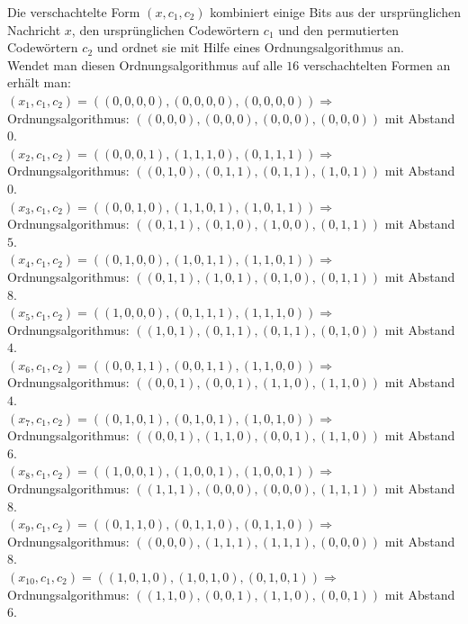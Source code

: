\begin{Beispiel}
    Die verschachtelte Form $(x,c_1,c_2)$ kombiniert einige Bits aus der ursprünglichen Nachricht $x$, den ursprünglichen Codewörtern $c_1$ und den permutierten Codewörtern $c_2$ und ordnet sie mit Hilfe eines Ordnungsalgorithmus an.\\
    Wendet man diesen Ordnungsalgorithmus auf alle $16$ verschachtelten Formen an erhält man:\\
    
    
    $(x_{1}, c_1, c_2) = ((0,0,0,0), (0,0,0,0), (0,0,0,0)) \Rightarrow$ Ordnungsalgorithmus: $((0,0,0),(0, 0,0),(0,0, 0),(0,0,0))$ mit Abstand $0$.\\
    
    $(x_{2}, c_1, c_2) = ((0,0,0,1), (1,1,1,0), (0,1,1,1)) \Rightarrow$ Ordnungsalgorithmus: $((0,1,0),(0, 1,1),(0,1, 1),(1,0,1))$ mit Abstand $0$.\\
    
    $(x_{3}, c_1, c_2) = ((0,0,1,0), (1,1,0,1), (1,0,1,1)) \Rightarrow$ Ordnungsalgorithmus: $((0,1,1),(0, 1,0),(1,0, 0),(0,1,1))$ mit Abstand $5$.\\
    
    $(x_{4}, c_1, c_2) = ((0,1,0,0), (1,0,1,1), (1,1,0,1)) \Rightarrow$ Ordnungsalgorithmus: $((0,1,1),(1, 0,1),(0,1, 0),(0,1,1))$ mit Abstand $8$.\\
    
    $(x_{5}, c_1, c_2) = ((1,0,0,0), (0,1,1,1), (1,1,1,0)) \Rightarrow$ Ordnungsalgorithmus: $((1,0,1),(0, 1,1),(0,1, 1),(0,1,0))$ mit Abstand $4$.\\
    
    $(x_{6}, c_1, c_2) = ((0,0,1,1), (0,0,1,1), (1,1,0,0)) \Rightarrow$ Ordnungsalgorithmus: $((0,0,1),(0, 0,1),(1,1, 0),(1,1,0))$ mit Abstand $4$.\\
    
    $(x_{7}, c_1, c_2) = ((0,1,0,1), (0,1,0,1), (1,0,1,0)) \Rightarrow$ Ordnungsalgorithmus: $((0,0,1),(1, 1,0),(0,0, 1),(1,1,0))$ mit Abstand $6$.\\
    
    $(x_{8}, c_1, c_2) = ((1,0,0,1), (1,0,0,1), (1,0,0,1)) \Rightarrow$ Ordnungsalgorithmus: $((1,1,1),(0, 0,0),(0,0, 0),(1,1,1))$ mit Abstand $8$.\\
    
    $(x_{9}, c_1, c_2) = ((0,1,1,0), (0,1,1,0), (0,1,1,0)) \Rightarrow$ Ordnungsalgorithmus: $((0,0,0),(1, 1,1),(1,1, 1),(0,0,0))$ mit Abstand $8$.\\
    
    $(x_{10}, c_1, c_2) = ((1,0,1,0), (1,0,1,0), (0,1,0,1)) \Rightarrow$ Ordnungsalgorithmus: $((1,1,0),(0, 0,1),(1,1, 0),(0,0,1))$ mit Abstand $6$.\\
    

\end{Beispiel}
